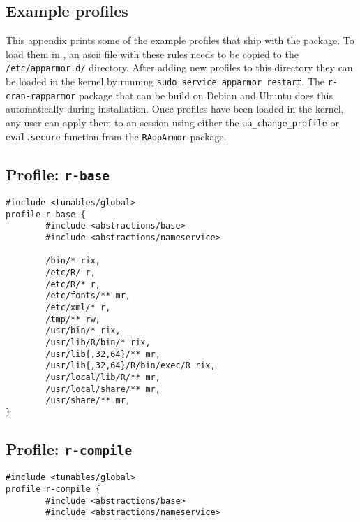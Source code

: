 

\begin{appendix}
\chapter{Example profiles}

This appendix prints some of the example profiles that ship with the \RAppArmor
package. To load them in \AppArmor, an ascii file with these rules needs to be
copied to the \texttt{/etc/apparmor.d/} directory. After adding new profiles to
this directory they can be loaded in the kernel by running \texttt{sudo service
apparmor restart}. The \texttt{r-cran-rapparmor} package that can be build on
Debian and Ubuntu does this automatically during installation. Once profiles
have been loaded in the kernel, any user can apply them to an \R session using
either the \texttt{aa\_change\_profile} or \texttt{eval.secure} function from
the \texttt{RAppArmor} package.

\section{Profile: \texttt{r-base}}
\label{r-base}

\begin{footnotesize}
\begin{verbatim}
#include <tunables/global>
profile r-base {
        #include <abstractions/base>
        #include <abstractions/nameservice>

        /bin/* rix,
        /etc/R/ r,
        /etc/R/* r,
        /etc/fonts/** mr,
        /etc/xml/* r,
        /tmp/** rw,
        /usr/bin/* rix,
        /usr/lib/R/bin/* rix,
        /usr/lib{,32,64}/** mr,
        /usr/lib{,32,64}/R/bin/exec/R rix,
        /usr/local/lib/R/** mr,
        /usr/local/share/** mr,
        /usr/share/** mr,
}
\end{verbatim}
\end{footnotesize}

\section{Profile: \texttt{r-compile}}
\label{r-compile}

\begin{footnotesize}
\begin{verbatim}
#include <tunables/global>
profile r-compile {
        #include <abstractions/base>
        #include <abstractions/nameservice>


\end{verbatim}
\end{footnotesize}
\end{appendix}
